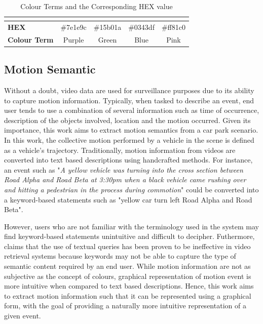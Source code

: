 \begin{table}[!ht]
\begin{tabular}{lcccc}
\multicolumn{1}{l|}{}                     & \multicolumn{1}{l|}{\cellcolor[HTML]{7E1E9C}} & \multicolumn{1}{l|}{\cellcolor[HTML]{15B01A}} & \multicolumn{1}{l|}{\cellcolor[HTML]{0343DF}} & \multicolumn{1}{l|}{\cellcolor[HTML]{FF81C0}} \\ \hline
\multicolumn{1}{|l|}{\textbf{HEX}}        & \multicolumn{1}{c|}{\#7e1e9c}                 & \multicolumn{1}{c|}{\#15b01a}                 & \multicolumn{1}{c|}{\#0343df}                 & \multicolumn{1}{c|}{\#ff81c0}                 \\ \hline
\multicolumn{1}{|l|}{\textbf{Colour Term}}  & \multicolumn{1}{c|}{Purple}                   & \multicolumn{1}{c|}{Green}                    & \multicolumn{1}{c|}{Blue}                     & \multicolumn{1}{c|}{Pink}                     \\ \hline
\end{tabular}
\caption{Colour Terms and the Corresponding HEX value}
\label{table:colorshex}
\end{table}



\subsection{Motion Semantic}

Without a doubt, video data are used for surveillance purposes due to its ability to capture motion information.
Typically, when tasked to describe an event, end user tends to use a combination of several information such as time of occurrence, description of the objects involved, location and the motion occurred.
Given its importance, this work aims to extract motion semantics from a car park scenario.
In this work, the collective motion performed by a vehicle in the scene is defined as a vehicle's trajectory.
Traditionally, motion information from videos are converted into text based descriptions using handcrafted methods. For instance, an event such as "\textit{A yellow vehicle was turning into the cross section between Road Alpha and Road Beta at 3:30pm when a black vehicle came rushing over and hitting a pedestrian in the process during commotion}" could be converted into a keyword-based statements such as "yellow car turn left Road Alpha and Road Beta".

However, users who are not familiar with the terminology used in the system may find keyword-based statements unintuitive and difficult to decipher.
Futhermore, \cite{bhaumik2016hybrid} claims that the use of textual queries has been proven to be ineffective in video retrieval systems because keywords may not be able to capture the type of semantic content required by an end user.
While motion information are not as subjective as the concept of colours, graphical representation of motion event is more intuitive when compared to text based descriptions.
Hence, this work aims to extract motion information such that it can be represented using a graphical form, with the goal of providing a naturally more intuitive representation of a given event.

